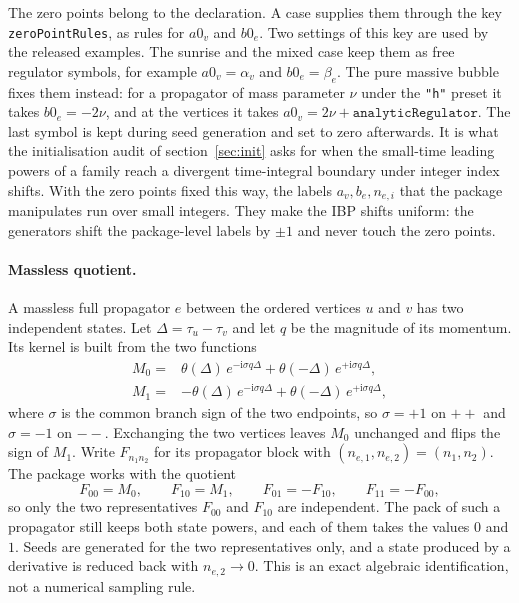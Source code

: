 \documentclass[11pt,a4paper]{article}
\begin{document}
The zero points belong to the declaration. A case supplies them through the key
\texttt{zeroPointRules}, as rules for $a0_v$ and $b0_e$. Two settings of this key are used by the
released examples. The sunrise and the mixed case keep them as free regulator symbols, for example
$a0_v=\alpha_v$ and $b0_e=\beta_e$. The pure massive bubble fixes them instead: for a propagator of
mass parameter $\nu$ under the \texttt{"h"} preset it takes
$b0_e=-2\nu$, and at
the vertices it takes $a0_v=2\nu+\texttt{analyticRegulator}$. The last symbol is kept during seed
generation and set to zero afterwards. It is what the initialisation audit of
section~\ref{sec:init} asks for when the small-time leading powers of a family reach a divergent
time-integral boundary under integer index shifts. With
the zero points fixed this way, the labels $a_v,b_e,n_{e,i}$ that the package manipulates run over
small integers. They make the IBP shifts uniform: the generators shift the package-level labels by
$\pm1$ and never touch the zero points.

\paragraph{Massless quotient.}
A massless full propagator $e$ between the ordered vertices $u$ and $v$ has two independent
states. Let $\Delta=\tau_u-\tau_v$ and let $q$ be the magnitude of its momentum. Its kernel is
built from the two functions
\begin{equation}
\begin{split}
M_0={}&\theta(\Delta)\,e^{-\mathrm{i}\sigma q\Delta}
      +\theta(-\Delta)\,e^{+\mathrm{i}\sigma q\Delta},\\
M_1={}&-\theta(\Delta)\,e^{-\mathrm{i}\sigma q\Delta}
      +\theta(-\Delta)\,e^{+\mathrm{i}\sigma q\Delta},
\end{split}
\label{eq:masslessBlocks}
\end{equation}
where $\sigma$ is the common branch sign of the two endpoints, so $\sigma=+1$ on $++$ and
$\sigma=-1$ on $--$. Exchanging the two vertices leaves $M_0$ unchanged and flips the sign of $M_1$.
Write $F_{n_1n_2}$ for its propagator block with
$(n_{e,1},n_{e,2})=(n_1,n_2)$. The package works with the quotient
\begin{equation}
F_{00}=M_0,\qquad F_{10}=M_1,\qquad
F_{01}=-F_{10},\qquad F_{11}=-F_{00},
\label{eq:masslessQuotient}
\end{equation}
so only the two representatives $F_{00}$ and $F_{10}$ are independent. The pack of such a
propagator still
keeps both state powers, and each of them takes the values $0$ and $1$. Seeds are generated for the two
representatives only, and a state produced by a derivative is reduced back with $n_{e,2}\to0$. This is
an exact algebraic identification, not a numerical sampling rule.
\end{document}
